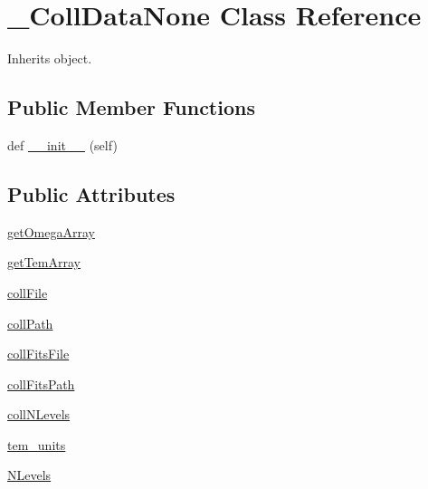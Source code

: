 \hypertarget{classpyneb_1_1core_1_1pynebcore_1_1___coll_data_none}{}\section{\+\_\+\+Coll\+Data\+None Class Reference}
\label{classpyneb_1_1core_1_1pynebcore_1_1___coll_data_none}


Inherits object.

\subsection*{Public Member Functions}
\begin{DoxyCompactItemize}
\item 
def \hyperlink{classpyneb_1_1core_1_1pynebcore_1_1___coll_data_none_ae64f0875afe3067b97ba370b354b9213}{\+\_\+\+\_\+init\+\_\+\+\_\+} (self)
\end{DoxyCompactItemize}
\subsection*{Public Attributes}
\begin{DoxyCompactItemize}
\item 
\hyperlink{classpyneb_1_1core_1_1pynebcore_1_1___coll_data_none_afa0499ea1cf0e554a36961f6e364f8af}{get\+Omega\+Array}
\item 
\hyperlink{classpyneb_1_1core_1_1pynebcore_1_1___coll_data_none_a537334a5778aefbe7b0590b641bc1b57}{get\+Tem\+Array}
\item 
\hyperlink{classpyneb_1_1core_1_1pynebcore_1_1___coll_data_none_ab1799c18dddda68ec8651caf93c90e40}{coll\+File}
\item 
\hyperlink{classpyneb_1_1core_1_1pynebcore_1_1___coll_data_none_adde256ff299a719e21c78ff9aad1b68c}{coll\+Path}
\item 
\hyperlink{classpyneb_1_1core_1_1pynebcore_1_1___coll_data_none_a1570b17843b0152b836049295bedb8ec}{coll\+Fits\+File}
\item 
\hyperlink{classpyneb_1_1core_1_1pynebcore_1_1___coll_data_none_aba92b77e6304fd2d31a920d7cd3a196d}{coll\+Fits\+Path}
\item 
\hyperlink{classpyneb_1_1core_1_1pynebcore_1_1___coll_data_none_a6bf0c64181b0f528302aeeaa628638dd}{coll\+N\+Levels}
\item 
\hyperlink{classpyneb_1_1core_1_1pynebcore_1_1___coll_data_none_a538e48ab1f2ca63dbe55abea69ca2242}{tem\+\_\+units}
\item 
\hyperlink{classpyneb_1_1core_1_1pynebcore_1_1___coll_data_none_a4d45fe163c2108853ab418386bf4da56}{N\+Levels}
\end{DoxyCompactItemize}


